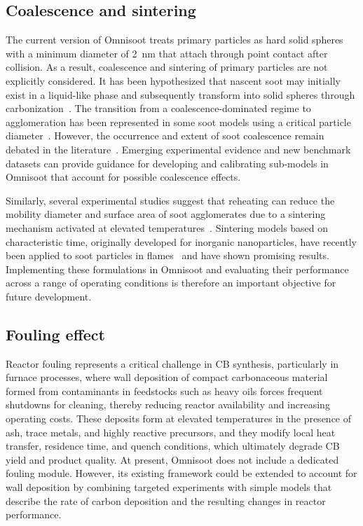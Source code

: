 \subsection{Coalescence and sintering}

The current version of Omnisoot treats primary particles as hard solid spheres with a minimum diameter of 2~nm that attach through point contact after collision. As a result, coalescence and sintering of primary particles are not explicitly considered. It has been hypothesized that nascent soot may initially exist in a liquid-like phase and subsequently transform into solid spheres through carbonization~\citep{reilly2000direct}. The transition from a coalescence-dominated regime to agglomeration has been represented in some soot models using a critical particle diameter~\citep{appel2000kinetic}. However, the occurrence and extent of soot coalescence remain debated in the literature~\cite{martin2022soot}. Emerging experimental evidence and new benchmark datasets can provide guidance for developing and calibrating sub-models in Omnisoot that account for possible coalescence effects.

Similarly, several experimental studies suggest that reheating can reduce the mobility diameter and surface area of soot agglomerates due to a sintering mechanism activated at elevated temperatures~\citep{ono2017experimental}. Sintering models based on characteristic time, originally developed for inorganic nanoparticles, have recently been applied to soot particles in flames~\citep{o2026role} and have shown promising results. Implementing these formulations in Omnisoot and evaluating their performance across a range of operating conditions is therefore an important objective for future development.


\subsection{Fouling effect}
Reactor fouling represents a critical challenge in CB synthesis, particularly in furnace processes, where wall deposition of compact carbonaceous material formed from contaminants in feedstocks such as heavy oils forces frequent shutdowns for cleaning, thereby reducing reactor availability and increasing operating costs. These deposits form at elevated temperatures in the presence of ash, trace metals, and highly reactive precursors, and they modify local heat transfer, residence time, and quench conditions, which ultimately degrade CB yield and product quality. At present, Omnisoot does not include a dedicated fouling module. However, its existing framework could be extended to account for wall deposition by combining targeted experiments with simple models that describe the rate of carbon deposition and the resulting changes in reactor performance.

